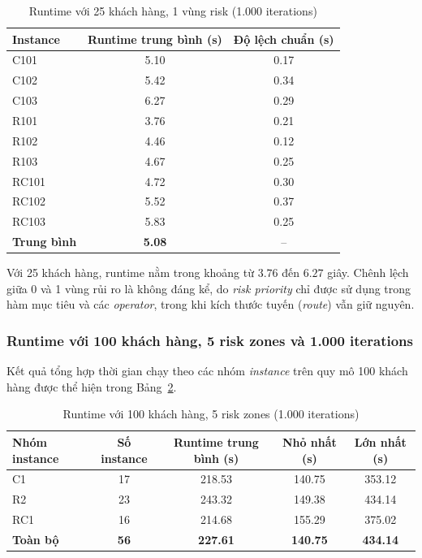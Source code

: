 \documentclass{article}
\begin{document}
\begin{table}[htbp]
    \centering
    \caption{Runtime với 25 khách hàng, 1 vùng risk (1.000 iterations)}
    \label{tab:runtime_25_1risk}
    \begin{tabular}{|l|c|c|}
        \hline
        \textbf{Instance} & \textbf{Runtime trung bình (s)} & \textbf{Độ lệch chuẩn (s)} \\ \hline
        C101 & 5.10 & 0.17 \\ \hline
        C102 & 5.42 & 0.34 \\ \hline
        C103 & 6.27 & 0.29 \\ \hline
        R101 & 3.76 & 0.21 \\ \hline
        R102 & 4.46 & 0.12 \\ \hline
        R103 & 4.67 & 0.25 \\ \hline
        RC101 & 4.72 & 0.30 \\ \hline
        RC102 & 5.52 & 0.37 \\ \hline
        RC103 & 5.83 & 0.25 \\ \hline
        \textbf{Trung bình} & \textbf{5.08} & -- \\ \hline
    \end{tabular}
\end{table}

Với 25 khách hàng, runtime nằm trong khoảng từ $3.76$ đến $6.27$ giây. Chênh lệch giữa 0 và 1 vùng rủi ro là không đáng kể, do \textit{risk priority} chỉ được sử dụng trong hàm mục tiêu và các \textit{operator}, trong khi kích thước tuyến (\textit{route}) vẫn giữ nguyên.

\subsubsection{Runtime với 100 khách hàng, 5 risk zones và 1.000 iterations}

Kết quả tổng hợp thời gian chạy theo các nhóm \textit{instance} trên quy mô 100 khách hàng được thể hiện trong Bảng~\ref{tab:runtime_100_5risk}.

\begin{table}[htbp]
    \centering
    \caption{Runtime với 100 khách hàng, 5 risk zones (1.000 iterations)}
    \label{tab:runtime_100_5risk}
    \begin{tabular}{|l|c|c|c|c|}
        \hline
        \textbf{Nhóm instance} & \textbf{Số instance} & \textbf{Runtime trung bình (s)} & \textbf{Nhỏ nhất (s)} & \textbf{Lớn nhất (s)} \\ \hline
        C1 & 17 & 218.53 & 140.75 & 353.12 \\ \hline
        R2 & 23 & 243.32 & 149.38 & 434.14 \\ \hline
        RC1 & 16 & 214.68 & 155.29 & 375.02 \\ \hline
        \textbf{Toàn bộ} & \textbf{56} & \textbf{227.61} & \textbf{140.75} & \textbf{434.14} \\ \hline
    \end{tabular}
\end{table}
\end{document}
